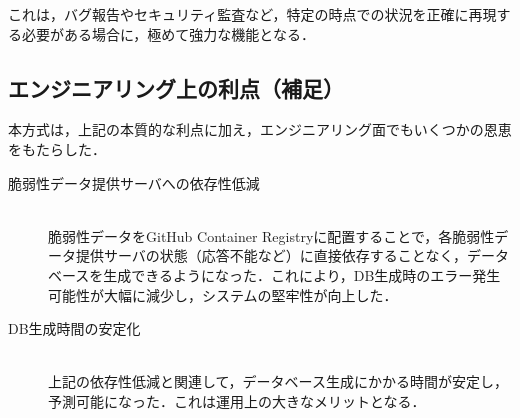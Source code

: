 これは，バグ報告やセキュリティ監査など，特定の時点での状況を正確に再現する必要がある場合に，極めて強力な機能となる．

\subsection{エンジニアリング上の利点（補足）}

本方式は，上記の本質的な利点に加え，エンジニアリング面でもいくつかの恩恵をもたらした．

\begin{description}
  \item[脆弱性データ提供サーバへの依存性低減] \mbox{} \\
    脆弱性データをGitHub Container Registryに配置することで，各脆弱性データ提供サーバの状態（応答不能など）に直接依存することなく，データベースを生成できるようになった．これにより，DB生成時のエラー発生可能性が大幅に減少し，システムの堅牢性が向上した．
  \item[DB生成時間の安定化] \mbox{} \\
    上記の依存性低減と関連して，データベース生成にかかる時間が安定し，予測可能になった．これは運用上の大きなメリットとなる．
\end{description}
